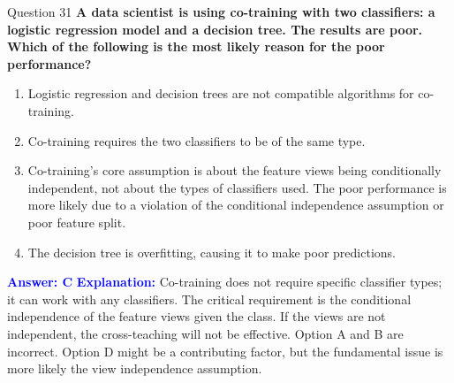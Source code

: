 \documentclass{beamer}
\begin{document}
	\begin{frame}{Question 31}
		\textbf{A data scientist is using co-training with two classifiers: a logistic regression model and a decision tree. The results are poor. Which of the following is the most likely reason for the poor performance?}
		\begin{enumerate}
			\item Logistic regression and decision trees are not compatible algorithms for co-training.
			\item Co-training requires the two classifiers to be of the same type.
			\item Co-training's core assumption is about the feature views being conditionally independent, not about the types of classifiers used. The poor performance is more likely due to a violation of the conditional independence assumption or poor feature split.
			\item The decision tree is overfitting, causing it to make poor predictions.
		\end{enumerate}
		\vspace{0.2cm}
		\textcolor{blue}{\textbf{Answer: C}}
		\vspace{0.2cm}
		\textcolor{blue}{\textbf{Explanation:}} Co-training does not require specific classifier types; it can work with any classifiers. The critical requirement is the conditional independence of the feature views given the class. If the views are not independent, the cross-teaching will not be effective. Option A and B are incorrect. Option D might be a contributing factor, but the fundamental issue is more likely the view independence assumption.
	\end{frame}
	
\end{document}
